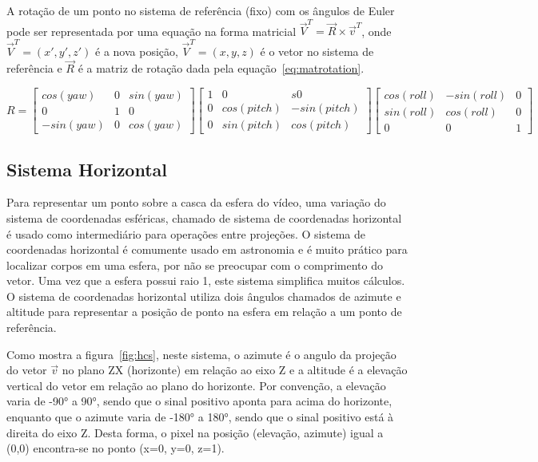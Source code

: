 A rotação de um ponto no sistema de referência (fixo) com os ângulos de Euler pode ser representada por uma equação na forma matricial $\overrightarrow{V}^T = \overrightarrow{R} \times \overrightarrow{v}^T $, onde $\overrightarrow{V}^T = (x',y',z')$ é a nova posição, $\overrightarrow{V}^T = (x,y,z)$ é o vetor no sistema de referência e $\overrightarrow{R}$ é a matriz de rotação dada pela equação~\ref{eq:matrotation}.

\begin{equation}
	R=\begin{bmatrix}
		cos(yaw) & 0 & sin(yaw)\\
		0 & 1 & 0\\
		-sin(yaw) & 0 & cos(yaw)
	\end{bmatrix}
	\begin{bmatrix}
		1 & 0 & s0\\
		0 & cos(pitch) & -sin(pitch)\\
		0 & sin(pitch) & cos(pitch)
	\end{bmatrix}
	\begin{bmatrix}
		cos(roll) & -sin(roll) & 0\\
		sin(roll) & cos(roll) & 0\\
		0 & 0 & 1
	\end{bmatrix}
	\label{eq:matrotation}
\end{equation}

\subsection{Sistema Horizontal}

Para representar um ponto sobre a casca da esfera do vídeo, uma variação do sistema de coordenadas esféricas, chamado de sistema de coordenadas horizontal é usado como intermediário para operações entre projeções. O sistema de coordenadas horizontal é comumente usado em astronomia e é muito prático para localizar corpos em uma esfera, por não se preocupar com o comprimento do vetor. Uma vez que a esfera possui raio 1, este sistema simplifica muitos cálculos. O sistema de coordenadas horizontal utiliza dois ângulos chamados de azimute e altitude para representar a posição de ponto na esfera em relação a um ponto de referência.

Como mostra a figura~\ref{fig:hcs}, neste sistema, o azimute é o angulo da projeção do vetor $ \overrightarrow{v}$ no plano ZX (horizonte) em relação ao eixo Z e a altitude é a elevação vertical do vetor em relação ao plano do horizonte. Por convenção, a elevação varia de -90° a 90°, sendo que o sinal positivo aponta para acima do horizonte, enquanto que o azimute varia de -180° a 180°, sendo que o sinal positivo está à direita do eixo Z. Desta forma, o pixel na posição (elevação, azimute) igual a (0,0) encontra-se no ponto (x=0, y=0, z=1).

